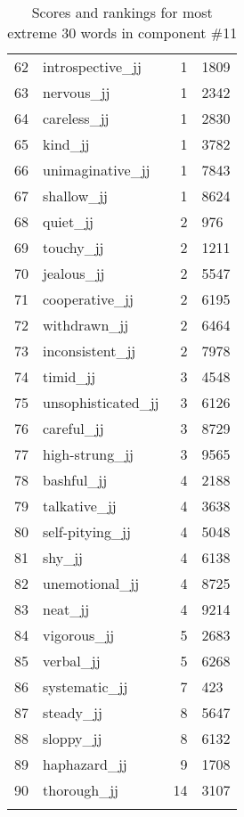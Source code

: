 \begin{longtable}[!htbp]{| rlr@{.}l |}
    62 & introspective\_jj & 1 & 1809 \\
    63 & nervous\_jj & 1 & 2342 \\
    64 & careless\_jj & 1 & 2830 \\
    65 & kind\_jj & 1 & 3782 \\
    66 & unimaginative\_jj & 1 & 7843 \\
    67 & shallow\_jj & 1 & 8624 \\
    68 & quiet\_jj & 2 & 976 \\
    69 & touchy\_jj & 2 & 1211 \\
    70 & jealous\_jj & 2 & 5547 \\
    71 & cooperative\_jj & 2 & 6195 \\
    72 & withdrawn\_jj & 2 & 6464 \\
    73 & inconsistent\_jj & 2 & 7978 \\
    74 & timid\_jj & 3 & 4548 \\
    75 & unsophisticated\_jj & 3 & 6126 \\
    76 & careful\_jj & 3 & 8729 \\
    77 & high-strung\_jj & 3 & 9565 \\
    78 & bashful\_jj & 4 & 2188 \\
    79 & talkative\_jj & 4 & 3638 \\
    80 & self-pitying\_jj & 4 & 5048 \\
    81 & shy\_jj & 4 & 6138 \\
    82 & unemotional\_jj & 4 & 8725 \\
    83 & neat\_jj & 4 & 9214 \\
    84 & vigorous\_jj & 5 & 2683 \\
    85 & verbal\_jj & 5 & 6268 \\
    86 & systematic\_jj & 7 & 423 \\
    87 & steady\_jj & 8 & 5647 \\
    88 & sloppy\_jj & 8 & 6132 \\
    89 & haphazard\_jj & 9 & 1708 \\
    90 & thorough\_jj & 14 & 3107 \\
    \hline
    \caption{Scores and rankings for most extreme 30 words in component \#11} \\
\end{longtable}
